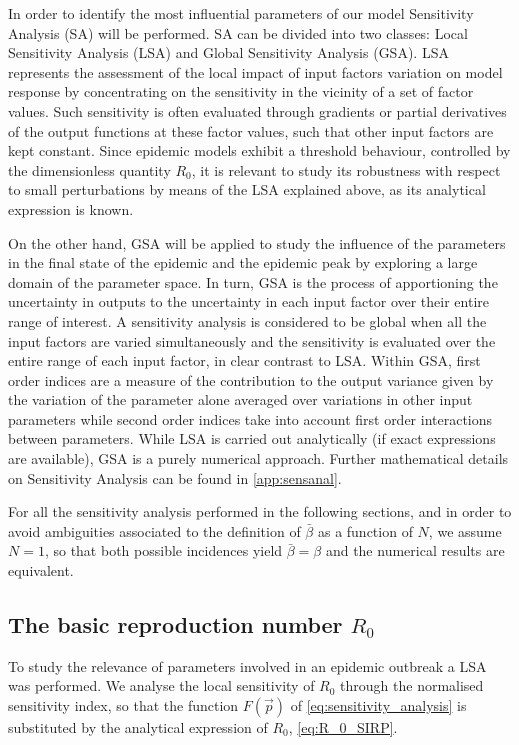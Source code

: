 In order to identify the most influential parameters of our model
Sensitivity Analysis (SA) will be performed. SA can be divided into two
classes: Local Sensitivity Analysis (LSA) and Global Sensitivity Analysis
(GSA). LSA represents the assessment of the local impact of input factors
variation on model response by concentrating on the sensitivity in the vicinity
of a set of factor values. Such sensitivity is often evaluated through
gradients or partial derivatives of the output functions at these factor
values, such that other input factors are kept constant.
Since epidemic models exhibit a threshold behaviour, controlled by the
dimensionless quantity
$R_0$, it is relevant to study its robustness with respect to small
perturbations by means of the LSA explained above, as its analytical expression
is known.

On the other hand, GSA will be applied to study the influence of the
parameters in the final state of the epidemic and the epidemic peak by
exploring a large domain of the parameter space. In turn, GSA is the process of
apportioning the uncertainty in outputs to the uncertainty in each input factor
over their entire range of interest. A sensitivity analysis is considered to be
global when all the input factors are varied simultaneously and the sensitivity
is evaluated over the entire range of each input factor, in clear contrast to
LSA. Within GSA, first order indices are a measure of the contribution to the
output variance given by the variation of the parameter alone averaged over
variations in other input parameters while second order indices take into
account first order interactions between parameters. While LSA is carried out
analytically (if exact expressions are available), GSA is a purely numerical
approach. Further mathematical details on Sensitivity Analysis can be found in
\cref{app:sensanal}.

For all the sensitivity analysis performed in the following sections, and
in order to avoid ambiguities associated to the definition of $\bar{\beta}$ as
a function of $N$, we assume $N=1$, so that both possible incidences yield
$\bar{\beta}=\beta$ and the numerical results are equivalent.

\subsection{The basic reproduction number $R_0$}

To study the relevance of parameters involved in an epidemic outbreak a LSA
was performed. We analyse the local sensitivity of $R_0$ through the normalised
sensitivity index, so that the function $F(\vec{p})$ of
\cref{eq:sensitivity_analysis} is substituted by the analytical expression of
$R_0$, \cref{eq:R_0_SIRP}.

